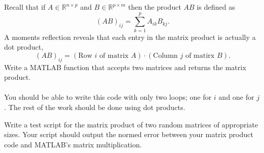 \begin{problem}\label{prob:matrix_mult}
    Recall that if $A \in \mathbb{R}^{n \times p}$ and $B \in \mathbb{R}^{p \times m}$
    then the product $AB$ is defined as
    \[ \left( AB \right)_{ij} = \sum_{k=1}^p A_{ik} B_{kj}. \]
    A moments reflection reveals that each entry in the matrix product is actually a dot
    product, 
    \[ \left( AB \right)_{ij} = \left( \text{Row $i$ of matrix $A$} \right) \cdot \left(
    \text{Column $j$ of matirx $B$} \right). \]
    Write a MATLAB function that accepts two matrices and returns the matrix product. \\
     \\
    You
    should be able to write this code with only two loops; one for $i$ and one for $j$.
    The rest of the work should be done using dot products.
\end{problem}
\begin{problem}
    Write a test script for the matrix product of two random matrices of appropriate sizes.  Your
    script should output the normed error between your matrix product code and MATLAB's
    matrix multiplication.
\end{problem}

